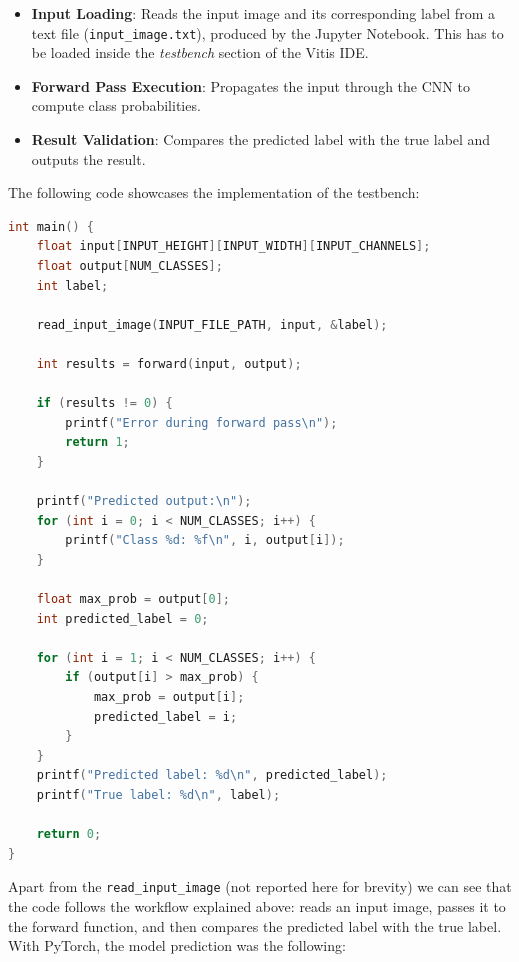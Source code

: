 \documentclass{article}
\begin{document}
\begin{itemize}
    \item \textbf{Input Loading}: Reads the input image and its corresponding label from a text file (\texttt{input\_image.txt}), produced by the Jupyter Notebook. This has to be loaded inside the \textit{testbench} section of the Vitis IDE.
    \item \textbf{Forward Pass Execution}: Propagates the input through the CNN to compute class probabilities.
    \item \textbf{Result Validation}: Compares the predicted label with the true label and outputs the result.
\end{itemize}

The following code showcases the implementation of the testbench:

\begin{lstlisting}[language=C]
int main() {
    float input[INPUT_HEIGHT][INPUT_WIDTH][INPUT_CHANNELS];
    float output[NUM_CLASSES];
    int label;

    read_input_image(INPUT_FILE_PATH, input, &label);

    int results = forward(input, output);

    if (results != 0) {
        printf("Error during forward pass\n");
        return 1;
    }

    printf("Predicted output:\n");
    for (int i = 0; i < NUM_CLASSES; i++) {
        printf("Class %d: %f\n", i, output[i]);
    }

    float max_prob = output[0];
    int predicted_label = 0;

    for (int i = 1; i < NUM_CLASSES; i++) {
        if (output[i] > max_prob) {
            max_prob = output[i];
            predicted_label = i;
        }
    }
    printf("Predicted label: %d\n", predicted_label);
    printf("True label: %d\n", label);

    return 0;
}
\end{lstlisting}

Apart from the \texttt{read\_input\_image} (not reported here for brevity) we can see that the code follows the workflow explained above: reads an input image, passes it to the forward function, and then compares the predicted label with the true label. With PyTorch, the model prediction was the following:
\end{document}
